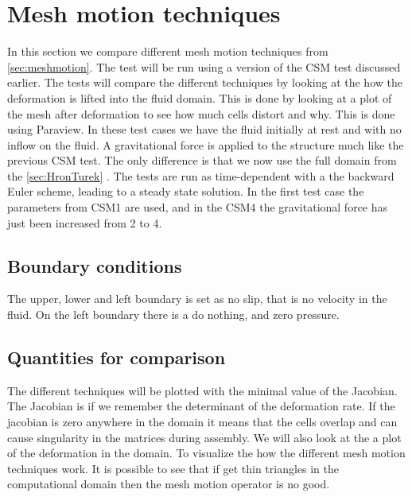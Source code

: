 \section{Mesh motion techniques}
In this section we compare different mesh motion techniques from \ref{sec:meshmotion}. The test will be run using a version of the CSM test discussed earlier. The tests will compare the different techniques by looking at the how the deformation is lifted into the fluid domain. This is done by looking at a plot of the mesh after deformation to see how much cells distort and why. This is done using Paraview.\newline
In these test cases we have the fluid initially at rest and with no inflow on the fluid. A gravitational force is applied to the structure much like the previous CSM test. The only difference is that we now use the full domain from the \ref{sec:HronTurek} . The tests are run as time-dependent with a the backward Euler scheme, leading to a steady state solution. In the first test case the parameters from CSM1 are used, and in the CSM4 the gravitational force has just been increased from 2 to 4. 
\subsection*{Boundary conditions}
The upper, lower and left boundary is set as no slip, that is no velocity in the fluid. On the left boundary there is a do nothing, and zero pressure. 
\subsection*{Quantities for comparison}
The different techniques will be plotted with the minimal value of the Jacobian. The Jacobian is if we remember the determinant of the deformation rate. If the jacobian is zero anywhere in the domain it means that the cells overlap and can cause singularity in the matrices during assembly. \newline
We will also look at the a plot of the deformation in the domain. To visualize the how the different mesh motion techniques work. It is possible to see that if get thin triangles in the computational domain then the mesh motion operator is no good. 

